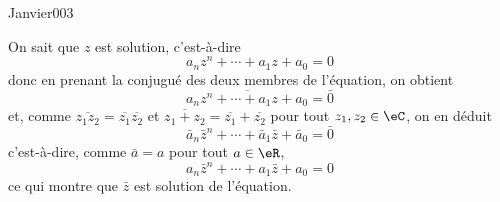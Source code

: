 \begin{corrige}{Janvier003}

On sait que $z$ est solution, c'est-à-dire
\begin{equation*}
  a_n z^n + \cdots + a_1 z + a_0 = 0
\end{equation*}
donc en prenant la conjugué des deux membres de l'équation, on obtient
\begin{equation*}
  \overline{a_n z^n + \cdots + a_1 z + a_0} = \bar 0
\end{equation*}
et, comme $\overline{z_1 z_2} = \overline{z_1} \overline{z_2}$ et
$\overline{z_1 + z_2} = \overline{z_1} + \overline{z_2}$ pour tout
$z_1, z_2 \in \eC$, on en déduit
\begin{equation*}
    \bar a_n\bar z^n + \cdots + \bar a_1\bar z +\bar a_0 = \bar 0
\end{equation*}
c'est-à-dire, comme $\bar a = a$ pour tout $a \in \eR$,
\begin{equation*}
  a_n \bar z^n + \cdots + a_1\bar z + a_0 = 0  
\end{equation*}
ce qui montre que $\bar z$ est solution de l'équation.


\end{corrige}
